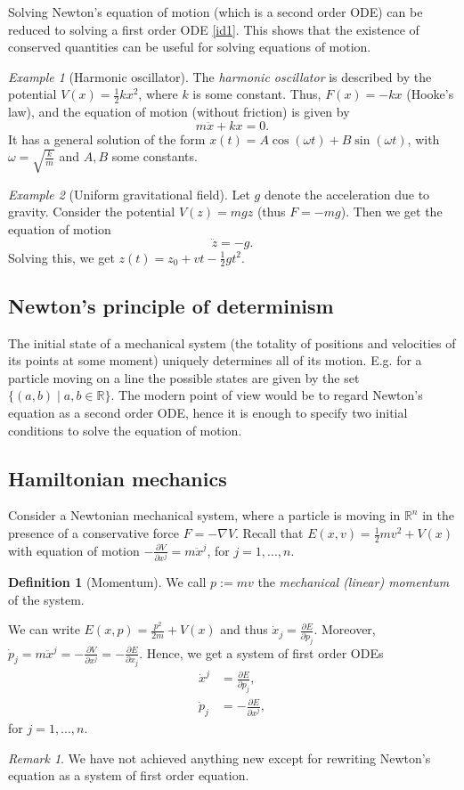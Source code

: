 \documentclass[11pt]{amsart}
\numberwithin{equation}{section}
\theoremstyle{plain}
\theoremstyle{definition}
\newtheorem{defn}{Definition}[subsection]
\theoremstyle{remark}
\newtheorem{rem}{Remark}[subsection]
\newtheorem{ex}{Example}[subsection]
\newcommand{\R}{\mathbb{R}}
\begin{document}
Solving Newton's equation of motion (which is a second order ODE) can be reduced to solving a first order ODE \eqref{id1}. This shows that the existence of conserved quantities can be useful for solving equations of motion.

\begin{ex}[Harmonic oscillator]
The \emph{harmonic oscillator} is described by the potential $V(x)=\frac{1}{2}kx^2$, where $k$ is some constant. Thus, $F(x)=-kx$ (Hooke's law), and the equation of motion (without friction) is given by 
\[
m\ddot{x}+kx=0.
\]
It has a general solution of the form $x(t)=A\cos(\omega t)+B\sin(\omega t)$, with $\omega=\sqrt{\frac{k}{m}}$ and $A,B$ some constants.
\end{ex}

\begin{ex}[Uniform gravitational field]
 Let $g$ denote the acceleration due to gravity. Consider the potential $V(z)=mgz$ (thus $F=-mg$). Then we get the equation of motion 
 \[
 \ddot{z}=-g.
\]
Solving this, we get $z(t)=z_0+vt-\frac{1}{2}gt^2$. 
\end{ex}

\subsection{Newton's principle of determinism}
The initial state of a mechanical system (the totality of positions and velocities of its points at some moment) uniquely determines all of its motion. E.g. for a particle moving on a line the possible states are given by the set $\{(a,b)\mid a,b\in\R\}$. The modern point of view would be to regard Newton's equation as a second order ODE, hence it is enough to specify two initial conditions to solve the equation of motion.

\subsection{Hamiltonian mechanics}
Consider a Newtonian mechanical system, where a particle is moving in $\R^n$ in the presence of a conservative force $F=-\nabla V$. Recall that $E(x,v)=\frac{1}{2}mv^2+V(x)$ with equation of motion $-\frac{\partial V}{\partial x^j}=m\ddot{x}^j$, for $j=1,...,n$.

\begin{defn}[Momentum]
We call $p:=mv$ the \emph{mechanical (linear) momentum} of the system.
\end{defn}

We can write $E(x,p)=\frac{p^2}{2m}+V(x)$ and thus $\dot{x}_j=\frac{\partial E}{\partial p_j}$. Moreover, $\dot{p}_j=m\ddot{x}^j=-\frac{\partial V}{\partial x^j}=-\frac{\partial E}{\partial x_j}$. Hence, we get a system of first order ODEs
\begin{align}
\dot{x}^j&=\frac{\partial E}{\partial p_j},\\
\dot{p}_j&=-\frac{\partial E}{\partial x^j},
\end{align}
for $j=1,...,n$. 
\begin{rem}
We have not achieved anything new except for rewriting Newton's equation as a system of first order equation.
\end{rem}
\end{document}
